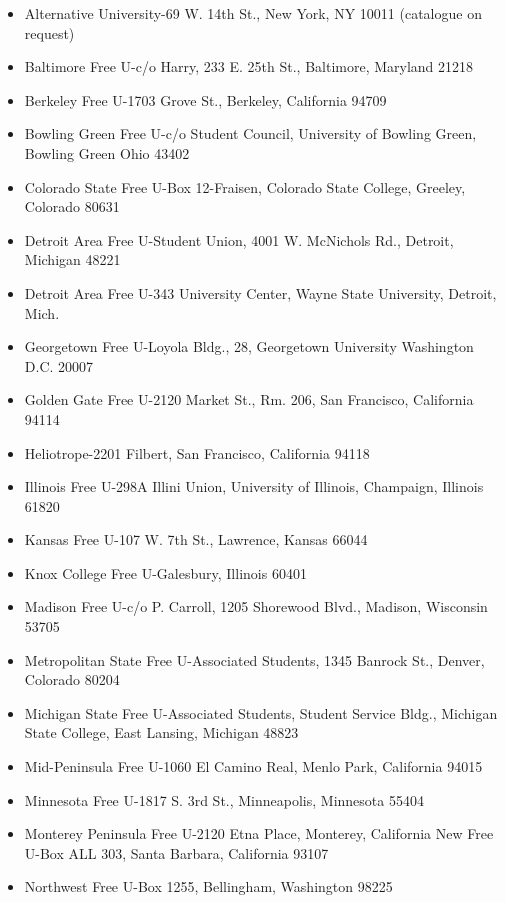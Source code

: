 \documentclass[11pt,twoside,a4paper]{book}
\begin{document}
\begin{small} \begin{itemize}
	\item Alternative University-69 W. 14th St., New York, NY 10011 (catalogue on request) 
	\item Baltimore Free U-c/o Harry, 233 E. 25th St., Baltimore, Maryland 21218 
	\item Berkeley Free U-1703 Grove St., Berkeley, California 94709 
	\item Bowling Green Free U-c/o Student Council, University of Bowling Green, Bowling Green Ohio 43402  
	\item Colorado State Free U-Box 12-Fraisen, Colorado State College, Greeley, Colorado 80631
	\item Detroit Area Free U-Student Union, 4001 W. McNichols Rd., Detroit, Michigan 48221 
	\item Detroit Area Free U-343 University Center, Wayne State University, Detroit, Mich. 
	\item Georgetown Free U-Loyola Bldg., 28, Georgetown University Washington D.C. 20007 
	\item Golden Gate Free U-2120 Market St., Rm. 206, San Francisco, California 94114 
	\item Heliotrope-2201 Filbert, San Francisco, California 94118 
	\item Illinois Free U-298A Illini Union, University of Illinois, Champaign, Illinois 61820 
	\item Kansas Free U-107 W. 7th St., Lawrence, Kansas 66044 
	\item Knox College Free U-Galesbury, Illinois 60401 
	\item Madison Free U-c/o P. Carroll, 1205 Shorewood Blvd., Madison, Wisconsin 53705 
	\item Metropolitan State Free U-Associated Students, 1345 Banrock St., Denver, Colorado 80204
	\item Michigan State Free U-Associated Students, Student Service Bldg., Michigan State College, East Lansing, Michigan 48823 
	\item Mid-Peninsula Free U-1060 El Camino Real, Menlo Park, California 94015 
	\item Minnesota Free U-1817 S. 3rd St., Minneapolis, Minnesota 55404 
	\item Monterey Peninsula Free U-2120 Etna Place, Monterey, California
	  New Free U-Box ALL 303, Santa Barbara, California 93107 
	\item Northwest Free U-Box 1255, Bellingham, Washington 98225 

\end{itemize}
\end{small}
\end{document}
